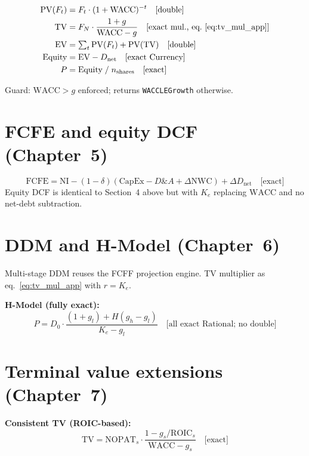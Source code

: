 \documentclass[12pt, a4paper, oneside]{book}
\newcommand{\FCFE}{\ensuremath{\mathrm{FCFE}}}
\newcommand{\WACC}{\ensuremath{\mathrm{WACC}}}
\newcommand{\NOPAT}{\ensuremath{\mathrm{NOPAT}}}
\newcommand{\ROIC}{\ensuremath{\mathrm{ROIC}}}
\newcommand{\EV}{\ensuremath{\mathrm{EV}}}
\newcommand{\TV}{\ensuremath{\mathrm{TV}}}
\newcommand{\Ke}{K_e}
\newcommand{\DA}{D\&A}
\newcommand{\NWC}{\mathrm{NWC}}
\begin{document}
\begin{align}
  \mathrm{PV}(F_t) &= F_t\cdot(1+\WACC)^{-t} \quad\text{[double]}\\
  \TV &= F_N\cdot\frac{1+g}{\WACC-g}
       \quad\text{[exact mul., eq.~\eqref{eq:tv_mul_app}]}\\
  \EV &= \textstyle\sum_t\mathrm{PV}(F_t)+\mathrm{PV}(\TV) \quad\text{[double]}\\
  \text{Equity} &= \EV - D_{\mathrm{net}} \quad\text{[exact Currency]}\\
  P &= \text{Equity}\;/\;n_{\mathrm{shares}} \quad\text{[exact]}
\end{align}

Guard: $\WACC > g$ enforced; returns \texttt{WACCLEGrowth} otherwise.

\section{FCFE and equity DCF (Chapter~5)}

\begin{equation}
  \FCFE = \mathrm{NI} - (1-\delta)(\mathrm{CapEx}-\DA+\Delta\NWC)
          + \Delta D_{\mathrm{net}} \quad\text{[exact]}
\end{equation}
Equity DCF is identical to Section~4 above but with $\Ke$ replacing $\WACC$
and no net-debt subtraction.

\section{DDM and H-Model (Chapter~6)}

Multi-stage DDM reuses the FCFF projection engine.
TV multiplier as eq.~\eqref{eq:tv_mul_app} with $r=\Ke$.

\textbf{H-Model (fully exact):}
\begin{equation}
  P = D_0 \cdot
      \frac{(1+g_l)+H(g_h-g_l)}{\Ke-g_l}
  \quad\text{[all exact Rational; no double]}
\end{equation}

\section{Terminal value extensions (Chapter~7)}

\textbf{Consistent TV (ROIC-based):}
\begin{equation}
  \TV = \NOPAT_s\cdot\frac{1-g_s/\ROIC_s}{\WACC-g_s} \quad\text{[exact]}
\end{equation}
\end{document}
